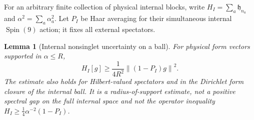 \documentclass[11pt,letterpaper]{article}
\newtheorem{lemma}[theorem]{Lemma}
\theoremstyle{definition}\newtheorem{hypothesis}[theorem]{Hypothesis}
\newcommand{\hh}{\mathfrak h}
\newcommand{\norm}[1]{\left\lVert #1\right\rVert}
\numberwithin{equation}{section}
\begin{document}
For an arbitrary finite collection of physical internal blocks, write
$H_I=\sum_a\hh_{n_a}$ and $\alpha^2=\sum_a\alpha_a^2$.
Let $P_I$ be Haar averaging for their simultaneous internal $\operatorname{Spin}(9)$ action; it fixes all external spectators.
\begin{lemma}[Internal nonsinglet uncertainty on a ball]\label{lem:ball}
For physical form vectors supported in $\alpha\le R$,
\begin{equation}
 H_I[g]\ge\frac1{4R^2}\norm{(1-P_I)g}^2.\label{eq:ball}
\end{equation}
The estimate also holds for Hilbert-valued spectators and in the Dirichlet form closure of the internal ball. It is a radius-of-support estimate, not a positive spectral gap on the full internal space and not the operator inequality $H_I\ge\frac14\alpha^{-2}(1-P_I)$.
\end{lemma}
\end{document}
